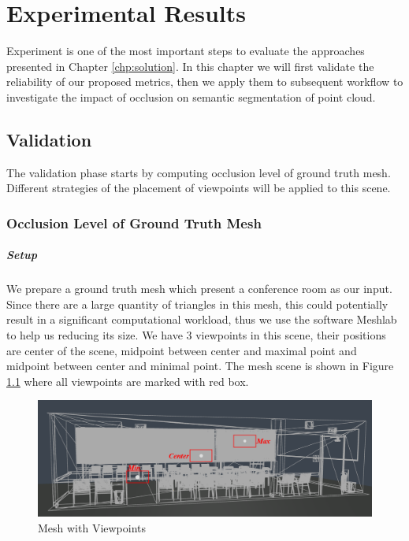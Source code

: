 \documentclass[11pt, a4paper,oneside,chapterprefix=false]{scrbook}
\begin{document}
\chapter{Experimental Results} \label{chp:experimental results}

Experiment is one of the most important steps to evaluate the approaches presented in Chapter \ref{chp:solution}. In this chapter we will first validate the reliability of our proposed metrics, then we apply them to subsequent workflow to investigate the impact of occlusion on semantic segmentation of point cloud.

\section{Validation}

The validation phase starts by computing occlusion level of ground truth mesh. Different strategies of the placement of viewpoints will be applied to this scene.

\subsection{Occlusion Level of Ground Truth Mesh} \label{subsec:occlusion of ground truth mesh}

\paragraph{Setup}

We prepare a ground truth mesh which present a conference room \cite{McGuire:17} as our input. Since there are a large quantity of triangles in this mesh, this could potentially result in a significant computational workload, thus we use the software Meshlab \cite{meshlab} to help us reducing its size. We have 3 viewpoints in this scene, their positions are center of the scene, midpoint between center and maximal point and midpoint between center and minimal point. The mesh scene is shown in Figure \ref{fig:mesh with viewpoints} where all viewpoints are marked with red box. 

\vspace{20pt}

\begin{figure}[H]
    \centering
    \includegraphics*[width=1.0\textwidth]{figures/mesh with vps.png}
    \caption{Mesh with Viewpoints}
    \label{fig:mesh with viewpoints}
\end{figure}
\end{document}
